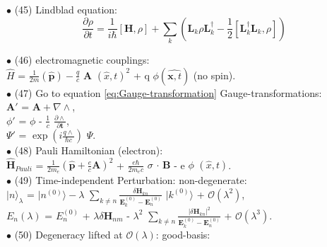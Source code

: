 \documentclass[a4paper, 10pt, onepage]{elegantbook}
\begin{document}
{$\bullet$ (45) Lindblad equation:  \\
\begin{equation}
\frac{\partial \rho} {\partial t} = \frac{1} {i \hbar} [ \mathbf H, \rho ] +  \sum_k ( \mathbf L_k \rho \mathbf L^\dagger_k - \frac{1} {2}[ \mathbf L^\dagger_k \mathbf L_k, \rho])
\end{equation}

$\bullet$ (46) electromagnetic couplings:  \\

$\hat{H}$ = $\frac{1}{2m}(\hat{\mathbf p}) - \frac{q}{c}$ $\mathbf A$ $(\hat{x}, t)^2$ + q $\phi(\hat{\mathbf x, t})$ (no spin).  \\ 

$\bullet$ (47) Go to equation \eqref{eq:Gauge-transformation} \quad Gauge-transformations:  \\

$\mathbf A'$ = $\mathbf A + \nabla \wedge$,   \\  

$\phi'$ = $\phi$ - $\frac{1}{c}$ $ \frac{\partial \wedge}{\partial {\mathbf t}}$, \\  

$\Psi'$ = $\exp(i \frac{q \wedge}{\hbar c})$ $\Psi$.  \\

$\bullet$ (48) Pauli Hamiltonian (electron):  \\

$\hat{\mathbf H}_{Pauli}$ = $ \frac{1}{2m_e} (\hat{\mathbf p} + \frac{e}{c} \mathbf A)^2$ + $\frac{e \hbar}{2m_e c}$ $\sigma$ $\cdot$ $\mathbf B$ - e $\phi$ $(\hat x,t)$. \\

$\bullet$ (49) Time-independent Perturbation:  non-degenerate:  \\

$\mid n \rangle_\lambda$ = $\mid n^{(0)} \rangle - \lambda$ $\sum_{k \neq n} \frac{\delta \mathbf H_{kn}} {\mathbf E^{(0)}_k - \mathbf E^{(0)}_n}$ $\mid k^{(0)} \rangle$ + $\mathcal O (\lambda^2)$,  \\

$E_n (\lambda)$ = $ E^{(0)}_n$ + $ \lambda \delta \mathbf H_{nm}$ - $\lambda^2$ $\sum_{k \neq n} \frac{ | \delta \mathbf H_{kn} |^2} {\mathbf E^{(0)}_k - \mathbf E^{(0)}_n}$ + $\mathcal O (\lambda^3)$. \\ 

 $\bullet$ (50) Degeneracy lifted at $\mathcal O (\lambda)$: good-basis: \\

}
\end{document}
